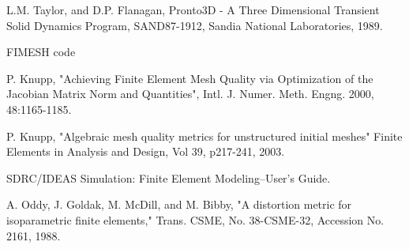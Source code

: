 \documentclass[12pt]{article}
\begin{document}
\begin{thebibliography}{99}

 L.M. Taylor, and D.P. Flanagan, Pronto3D - A 
Three Dimensional Transient Solid Dynamics Program, 
SAND87-1912, Sandia National Laboratories, 1989.

 FIMESH code

 P. Knupp, "Achieving Finite Element Mesh Quality
via Optimization of the Jacobian Matrix Norm and Quantities", 
Intl. J. Numer. Meth. Engng. 2000, 48:1165-1185.

 P. Knupp, "Algebraic mesh quality metrics for 
unstructured initial meshes" Finite Elements in Analysis and 
Design, Vol 39, p217-241, 2003. 

 SDRC/IDEAS Simulation: Finite Element 
Modeling--User's Guide.

 A. Oddy, J. Goldak, M. McDill, and M. Bibby, "A 
distortion metric for isoparametric finite elements," Trans. CSME,
No. 38-CSME-32, Accession No. 2161, 1988.


\end{thebibliography}
\end{document}
